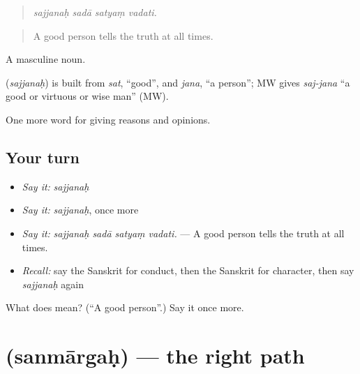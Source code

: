 \begin{quote}
   
\end{quote}

\begin{quote}
\emph{sajjanaḥ sadā satyaṃ vadati.}
\end{quote}

\begin{quote}
A good person tells the truth at all times.
\end{quote}

A masculine noun.

\begin{cousinweb}
\textbf{} (\emph{sajjanaḥ}) is built from \emph{sat}, \textquotedblleft{}good\textquotedblright{}, and \emph{jana}, \textquotedblleft{}a person\textquotedblright{}; MW gives \emph{saj-jana} \textquotedblleft{}a good or virtuous or wise man\textquotedblright{} (MW).
\end{cousinweb}

\begin{grammarlens}[title={What you've built}]
One more word for giving reasons and opinions.
\end{grammarlens}

\subsection*{Your turn}
\begin{itemize}
\raggedright
  \item \emph{Say it:} \emph{sajjanaḥ}
  \item \emph{Say it:} \emph{sajjanaḥ}, once more
  \item \emph{Say it:} \emph{sajjanaḥ sadā satyaṃ vadati.} — A good person tells the truth at all times.
  \item \emph{Recall:} say the Sanskrit for conduct, then the Sanskrit for character, then say \emph{sajjanaḥ} again
\end{itemize}

\begin{tcolorbox}[breakable,colback=teal!4,colframe=teal!35!black,title={Before you move on}]
What does  mean? (\textquotedblleft{}A good person\textquotedblright{}.) Say it once more.
\end{tcolorbox}
\section[\texorpdfstring{\sk{सन्मार्गः} (sanmārgaḥ)}{सन्मार्गः (sanmārgaḥ)}]{ (sanmārgaḥ) — the right path}

